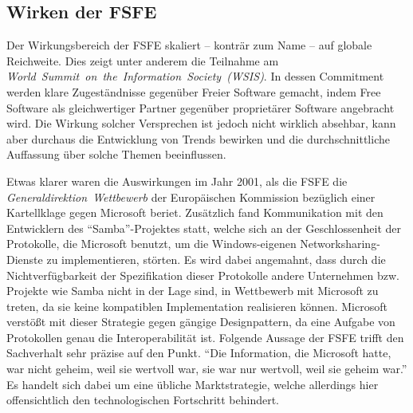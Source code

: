 \subsection{Wirken der FSFE}
Der Wirkungsbereich der FSFE skaliert -- konträr zum Name -- auf globale 
Reichweite. 
Dies zeigt unter anderem die Teilnahme am 
\emph{World~Summit~on~the~Information~Society~(WSIS)}. In dessen 
Commitment~\cite{WSISTunisCommitment} werden klare Zugeständnisse gegenüber 
Freier Software gemacht, indem Free Software als gleichwertiger Partner 
gegenüber proprietärer Software angebracht wird. Die Wirkung solcher Versprechen
ist jedoch nicht wirklich absehbar, kann aber durchaus die Entwicklung von 
Trends bewirken und die durchschnittliche Auffassung über solche Themen 
beeinflussen.

Etwas klarer waren die Auswirkungen im Jahr 2001, als die FSFE die 
\emph{Generaldirektion~Wettbewerb} der Europäischen Kommission bezüglich einer 
Kartellklage gegen Microsoft beriet. Zusätzlich fand Kommunikation mit den 
Entwicklern des ``Samba''-Projektes statt, welche sich an der Geschlossenheit 
der Protokolle, die Microsoft benutzt, um die Windows-eigenen 
Networksharing-Dienste zu implementieren, störten. Es wird dabei angemahnt, 
dass durch die Nichtverfügbarkeit der Spezifikation dieser Protokolle andere 
Unternehmen bzw. Projekte wie \zB Samba nicht in der Lage sind, in Wettbewerb 
mit Microsoft zu treten, da sie keine kompatiblen Implementation realisieren 
können. Microsoft verstößt mit dieser Strategie gegen gängige Designpattern, da 
eine Aufgabe von Protokollen genau die Interoperabilität ist. Folgende Aussage 
der FSFE trifft den Sachverhalt sehr präzise auf den Punkt. ``Die 
Information, die Microsoft hatte, war nicht geheim, weil sie wertvoll war, sie 
war nur wertvoll, weil sie geheim war.'' \cite{FsfeEUvsMS} Es handelt sich 
dabei um eine übliche Marktstrategie, welche allerdings hier offensichtlich den 
technologischen Fortschritt behindert.

